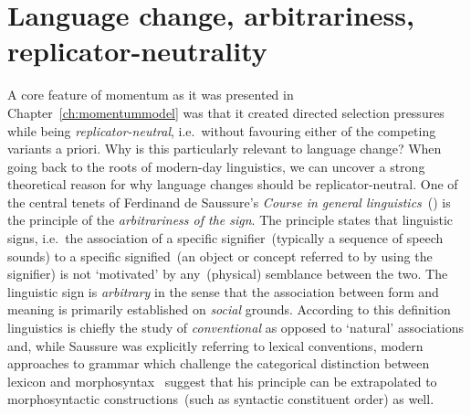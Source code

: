 

\section{Language change, arbitrariness, replicator-neutrality}
\label{sec:arbitrariness}

A core feature of momentum as it was presented in Chapter~\ref{ch:momentummodel} was that it created directed selection pressures while being \emph{replicator-neutral}, i.e.~without favouring either of the competing variants a priori. Why is this particularly relevant to language change?
When going back to the roots of modern-day linguistics, we can uncover a strong theoretical reason for why language changes should be replicator-neutral. One of the central tenets of Ferdinand de Saussure's \emph{Course in general linguistics}~(\citeyear{Saussure1916,Saussure1959}) is the principle of the \emph{arbitrariness of the sign}. The principle states that linguistic signs, i.e.~the association of a specific signifier~(typically a sequence of speech sounds) to a specific signified~(an object or concept referred to by using the signifier) is not `motivated' by any~(physical) semblance between the two. The linguistic sign is \emph{arbitrary} in the sense that the association between form and meaning is primarily established on \emph{social} grounds.
According to this definition linguistics is chiefly the study of \emph{conventional} as opposed to `natural' associations and, while Saussure was explicitly referring to lexical conventions, modern approaches to grammar which challenge the categorical distinction between lexicon and morphosyntax~\citep[e.g.~Construction Grammar, ][]{Goldberg1995} suggest that his principle can be extrapolated to morphosyntactic constructions~(such as syntactic constituent order) as well.

